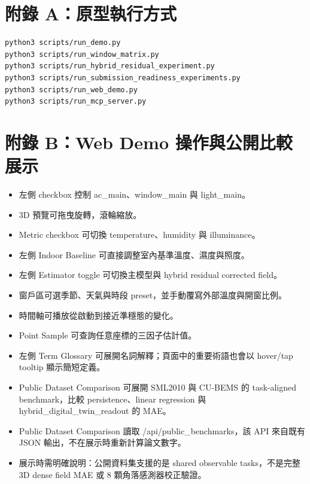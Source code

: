 \documentclass[12pt,a4paper]{article}
\begin{document}
\clearpage

\section*{附錄 A：原型執行方式}

\begin{lstlisting}[basicstyle=\footnotesize\ttfamily,breaklines=true,columns=flexible]
python3 scripts/run_demo.py
python3 scripts/run_window_matrix.py
python3 scripts/run_hybrid_residual_experiment.py
python3 scripts/run_submission_readiness_experiments.py
python3 scripts/run_web_demo.py
python3 scripts/run_mcp_server.py
\end{lstlisting}

\section*{附錄 B：Web Demo 操作與公開比較展示}

\begin{itemize}
\item 左側 checkbox 控制 ac\_\allowbreak{}main、window\_\allowbreak{}main 與 light\_\allowbreak{}main。
\item 3D 預覽可拖曳旋轉，滾輪縮放。
\item Metric checkbox 可切換 temperature、humidity 與 illuminance。
\item 左側 Indoor Baseline 可直接調整室內基準溫度、濕度與照度。
\item 左側 Estimator toggle 可切換主模型與 hybrid residual corrected field。
\item 窗戶區可選季節、天氣與時段 preset，並手動覆寫外部溫度與開窗比例。
\item 時間軸可播放從啟動到接近準穩態的變化。
\item Point Sample 可查詢任意座標的三因子估計值。
\item 左側 Term Glossary 可展開名詞解釋；頁面中的重要術語也會以 hover/tap tooltip 顯示簡短定義。
\item Public Dataset Comparison 可展開 SML2010 與 CU-BEMS 的 task-aligned benchmark，比較 persistence、linear regression 與 hybrid\_\allowbreak{}digital\_\allowbreak{}twin\_\allowbreak{}readout 的 MAE。
\item Public Dataset Comparison 讀取 /api/public\_\allowbreak{}benchmarks，該 API 來自既有 JSON 輸出，不在展示時重新計算論文數字。
\item 展示時需明確說明：公開資料集支援的是 shared observable tasks，不是完整 3D dense field MAE 或 8 顆角落感測器校正驗證。
\end{itemize}
\end{document}
